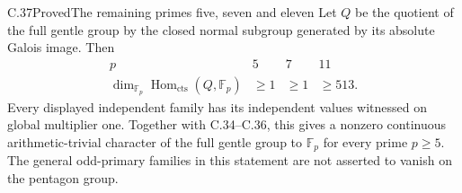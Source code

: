 \begin{statement}{C.37}{Proved}{The remaining primes five, seven and eleven}
Let $Q$ be the quotient of the full gentle group by the
closed normal subgroup generated by its absolute Galois image.
Then
\[
\begin{array}{c|rrr}
p&5&7&11\\ \hline
\dim_{\mathbb F_p}\operatorname{Hom}_{\mathrm{cts}}
             (Q,\mathbb F_p)&\geq1&\geq1&\geq513 .
\end{array}                                                     \tag{C37.1}
\]
Every displayed independent family has its independent
values witnessed on global multiplier one.
Together with C.34--C.36, this gives a nonzero continuous
arithmetic-trivial character of the full gentle group
to $\mathbb F_p$ for every prime $p\geq5$.
The general odd-primary families in this statement are
not asserted to vanish on the pentagon group.
\end{statement}
